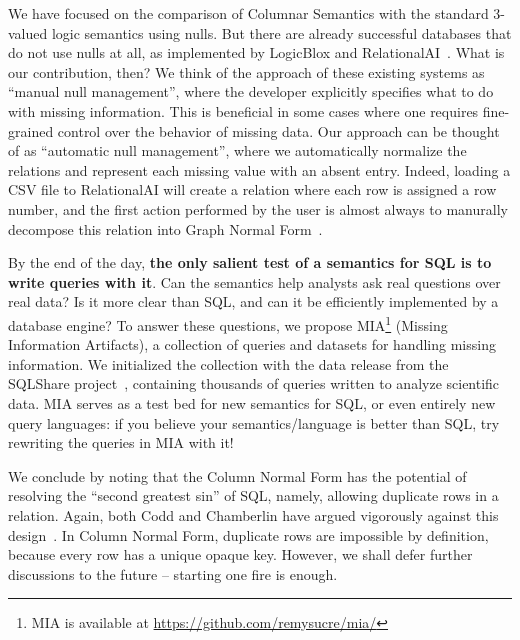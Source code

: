\documentclass[sigconf]{acmart}
\begin{document}
We have focused on the comparison of Columnar Semantics 
 with the standard 3-valued logic semantics using nulls.
But there are already successful databases
 that do not use nulls at all,
 as implemented by LogicBlox and RelationalAI~\cite{RAIDocumentation,DBLP:conf/sigmod/ArefCGKOPVW15}.
What is our contribution, then?
We think of the approach of these existing systems
 as ``manual null management'', 
 where the developer explicitly specifies what to do with missing information.
This is beneficial in some cases where one requires
 fine-grained control over the behavior of missing data.
Our approach can be thought of as ``automatic null management'',
 where we automatically normalize the relations 
 and represent each missing value with an absent entry.
Indeed, loading a \textsf{CSV} file to RelationalAI 
 will create a relation where each row is assigned a row number, 
 and the first action performed by the user is almost always 
 to manurally decompose this relation into Graph Normal Form~\cite{RAIDocumentation}.

By the end of the day, \textbf{the only salient test of a semantics for SQL
 is to write queries with it}.
Can the semantics help analysts ask real questions 
 over real data?
Is it more clear than SQL, 
 and can it be efficiently implemented by a database engine?
To answer these questions, 
 we propose MIA\footnote{MIA is available at \url{https://github.com/remysucre/mia/}} (Missing Information Artifacts),
 a collection of queries and datasets 
 for handling missing information.
We initialized the collection with the data release 
 from the SQLShare project~\cite{DBLP:conf/sigmod/JainMHHL16},
 containing thousands of queries written to analyze scientific data.
MIA serves as a test bed for new semantics for SQL, 
 or even entirely new query languages:
 if you believe your semantics/language is better than SQL,
 try rewriting the queries in MIA with it!

We conclude by noting that
 the Column Normal Form has the potential of 
 resolving the ``second greatest sin'' of SQL, 
 namely, allowing duplicate rows in a relation.
Again, both Codd and Chamberlin have argued 
 vigorously against this design~\cite{DBLP:books/aw/Codd90,DBLP:conf/sigmod/Chamberlin23}.
In Column Normal Form, 
 duplicate rows are impossible by definition,
 because every row has a unique opaque key.
However, we shall defer further discussions 
 to the future -- starting one fire is enough.



\end{document}
